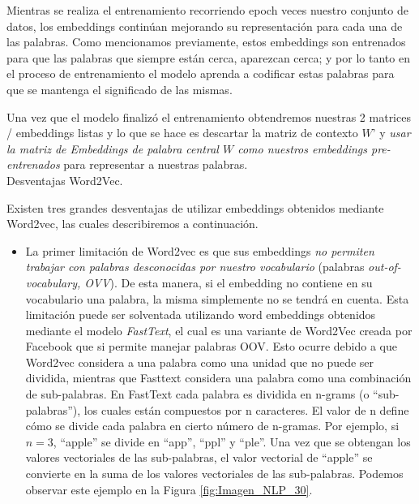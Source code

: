 \documentclass[12pt,a4paper]{article}
\makeatletter
\renewcommand\paragraph{\@startsection{paragraph}{4}{\z@}
            {-2.5ex\@plus -1ex \@minus -.25ex}
            {1.25ex \@plus .25ex}
            {\normalfont\normalsize\bfseries}}
\makeatother
\begin{document}
\begin{sloppypar}
Mientras se realiza el entrenamiento recorriendo epoch veces nuestro conjunto de datos, los embeddings continúan mejorando su representación para cada una de las palabras. Como mencionamos previamente, estos embeddings son entrenados para que las palabras que siempre están cerca, aparezcan cerca; y por lo tanto en el proceso de entrenamiento el modelo aprenda a codificar estas palabras para que se mantenga el significado de las mismas. 

Una vez que el modelo finalizó el entrenamiento obtendremos nuestras 2 matrices / embeddings listas y lo que se hace es descartar la matriz de contexto $W’$ y \textit{usar la matriz de Embeddings de palabra central $W$ como nuestros embeddings pre-entrenados} para representar a nuestras palabras. 
\\

\paragraph{Desventajas Word2Vec.}\label{desv_word2vec}

Existen tres grandes desventajas de utilizar embeddings obtenidos mediante Word2vec, las cuales describiremos a continuación.

\begin{itemize}
\item La primer limitación\cite{NLP_28} de Word2vec es que sus embeddings \textit{no permiten trabajar con palabras desconocidas por nuestro vocabulario} (palabras \textit{out-of-vocabulary, OVV}). De esta manera, si el embedding no contiene en su vocabulario una palabra, la misma simplemente no se tendrá en cuenta. Esta limitación puede ser solventada utilizando word embeddings obtenidos mediante el modelo \textit{FastText}, el cual es una variante de Word2Vec creada por Facebook que si permite manejar palabras OOV. Esto ocurre debido a que Word2vec considera a una palabra como una unidad que no puede ser dividida, mientras que Fasttext considera una palabra como una combinación de sub-palabras. En FastText cada palabra es dividida en n-grams (o “sub-palabras”), los cuales están compuestos por n caracteres. El valor de n define cómo se divide cada palabra en cierto número de n-gramas. Por ejemplo, si $n=3$, “apple” se divide en “app”, “ppl” y “ple”. Una vez que se obtengan los valores vectoriales de las sub-palabras, el valor vectorial de “apple” se convierte en la suma de los valores vectoriales de las sub-palabras. Podemos observar este ejemplo en la Figura \ref{fig:Imagen_NLP_30}.


\end{itemize}
\end{sloppypar}
\end{document}
